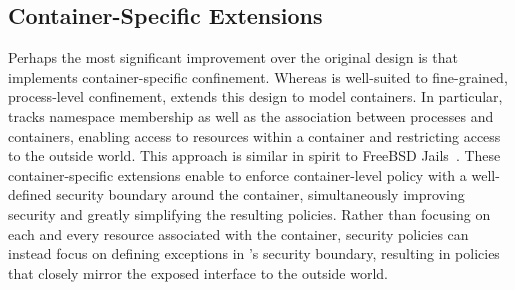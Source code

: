 
\subsection{Container-Specific Extensions}%
\label{ss:bpfcontain-extending}

Perhaps the most significant improvement over the original \bpfbox{} design is that
\bpfcontain{} implements container-specific confinement. Whereas \bpfbox{} is well-suited
to fine-grained, process-level confinement, \bpfcontain{} extends this design to model
containers. In particular, \bpfcontain{} tracks namespace membership as well as the
association between processes and containers, enabling access to resources within
a container and restricting access to the outside world. This approach is similar in
spirit to FreeBSD Jails~\cite{kamp2000_jails}. These container-specific extensions enable
\bpfcontain{} to enforce container-level policy with a well-defined security boundary
around the container, simultaneously improving security and greatly simplifying the
resulting policies. Rather than focusing on each and every resource associated with the
container, security policies can instead focus on defining exceptions in \bpfcontain{}'s
security boundary, resulting in policies that closely mirror the exposed interface to the
outside world.


